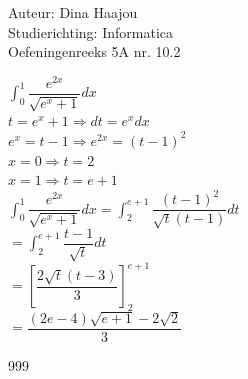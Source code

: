 \documentclass[a4paper]{article}
\begin{document}
\normalsize

\noindent \large Auteur: Dina Haajou \\
\noindent \large Studierichting: Informatica \\
\noindent \large Oefeningenreeks 5A nr. 10.2 \\

\medskip

\normalsize

$\displaystyle \int_0^1 \dfrac{e^{2x}}{\sqrt{e^x + 1}} dx$ \\

$t = e^x + 1 \Rightarrow dt = e^x dx$ \\

$e^x = t - 1 \Rightarrow e^{2x} = (t - 1)^2$ \\

$x = 0 \Rightarrow t = 2$ \\

$x = 1 \Rightarrow t = e + 1$ \\

$\displaystyle \int_0^1 \dfrac{e^{2x}}{\sqrt{e^x + 1}} dx = \displaystyle \int_2^{e+1} \dfrac{(t - 1)^2}{\sqrt{t}(t - 1)} dt$ \\

$= \displaystyle \int_2^{e+1} \dfrac{t - 1}{\sqrt{t}} dt$ \\

$= \left[ \dfrac{2\sqrt{t}(t - 3)}{3} \right]_2^{e+1}$ \\

$= \dfrac{(2e - 4)\sqrt{e + 1} - 2\sqrt{2}}{3}$ \\

\begin{thebibliography}{999}
\end{thebibliography}
\end{document}
